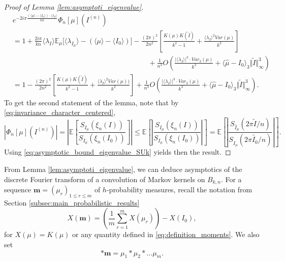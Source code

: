\documentclass[10pt,11pt]{amsart}%
\begin{document}
\begin{proof}[Proof of Lemma \ref{lem:asymptoti_eigenvalue}]
\begin{align*}
&e^{-2i\pi\frac{(\langle\mu\rangle-\langle I_0\rangle)\cdot\langle \lambda_I\rangle}{kn}}\Phi_{n}[\mu](I^{(n)})\\
&=1+\frac{2i\pi}{kn}\langle \lambda_I\rangle\mathbb{E}_{\mu}\Big[\langle \lambda_{I_{\mu}}\rangle-(\langle\mu\rangle-\langle I_0\rangle)\Big]-\frac{(2\pi)^2}{2n^2}\left[\frac{K(\mu)K(\widetilde{I})}{k^2-1}+\frac{\langle \lambda_I\rangle^2Var(\mu)}{k^2}\right]\\
&\hspace{8cm}+\frac{1}{n^3}O\left(\frac{\vert\langle \lambda_I\rangle\vert^3\cdot Var_3(\mu)}{k^3}+\langle\hat{\mu}-I_0\rangle_3\Vert \tilde{I}\Vert_\infty^3\right)\\
&=1-\frac{(2\pi)^2}{2n^2}\left[\frac{K(\mu)K(\widetilde{I})}{k^2-1}+\frac{\langle \lambda_I\rangle^2Var(\mu))}{k^2}\right]+\frac{1}{n^3}O\left(\frac{\vert\langle \lambda_I\rangle\vert^3\cdot Var_3(\mu)}{k^3}+\langle\hat{\mu}-I_0\rangle_3\Vert \tilde{I}\Vert_\infty^3\right).
\end{align*}
 To get the second statement of the lemma, note that by \eqref{eq:invariance_character_centered}, 
$$\left\vert \Phi_{n}[\mu](I^{(n)})\right\vert=\left\vert\mathbb{E}\left[\frac{S_{I_{\mu}}(\xi_{n}(I))}{S_{I_{\mu}}(\xi_{n}(I_0))}\right]\right\vert\leq \mathbb{E}\left[\left\vert\frac{S_{I_{\mu}}(\xi_{n}(I))}{S_{I_{\mu}}(\xi_{n}(I_0))}\right\vert\right]=\mathbb{E}\left[\left\vert\frac{S_{\hat{I}_{\mu}}\left(2\pi \tilde{I}/n\right)}{S_{\hat{I}_{\mu}}\left(2\pi\tilde{I_0}/n\right)}\right\vert\right].$$ 
Using \eqref{eq:asymptotic_bound_eigenvalue_SUk} yields then the result.
\end{proof}
From Lemma \ref{lem:asymptoti_eigenvalue}, we can deduce asymptotics of the discrete Fourier transform of a convolution of Markov kernels on $ B_{k,n}$. For a sequence $\mathbf{m}=(\mu_r)_{1\leq r\leq m}$ of $h$-probability measures, recall the notation from Section \ref{subsec:main_probabilistic_results}
$$X(\mathbf{m})=\left(\frac{1}{m}\sum_{r=1}^mX(\mu_r)\right)-X(I_0),$$
for $X(\mu)=K(\mu)$ or any quantity defined in \eqref{eq:definition_moments}. We also set 
$$*\mathbf{m}=\mu_1*\mu_2*\dots\mu_m.$$
\end{document}
